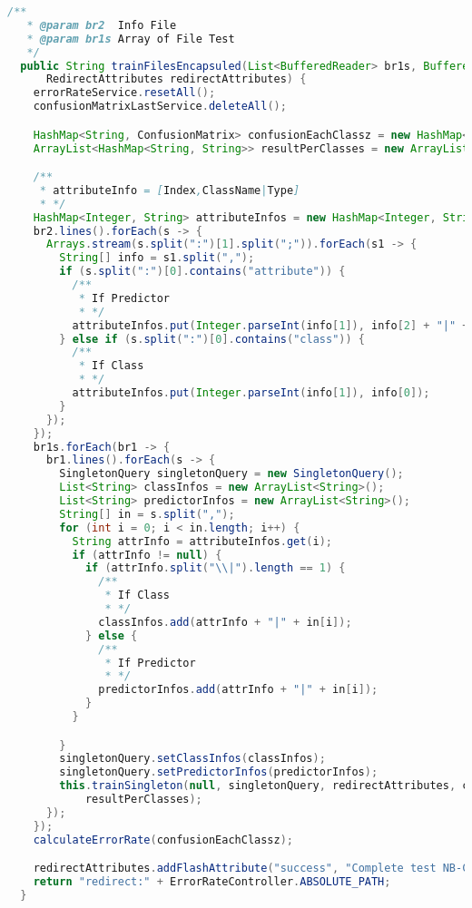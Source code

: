 \begin{lstlisting}[language=Java,basicstyle=\tiny,caption=TestingController.java]
  /**
   * @param br2  Info File
   * @param br1s Array of File Test
   */
  public String trainFilesEncapsuled(List<BufferedReader> br1s, BufferedReader br2,
      RedirectAttributes redirectAttributes) {
    errorRateService.resetAll();
    confusionMatrixLastService.deleteAll();

    HashMap<String, ConfusionMatrix> confusionEachClassz = new HashMap<String, ConfusionMatrix>();
    ArrayList<HashMap<String, String>> resultPerClasses = new ArrayList<HashMap<String, String>>();

    /**
     * attributeInfo = [Index,ClassName|Type]
     * */
    HashMap<Integer, String> attributeInfos = new HashMap<Integer, String>();
    br2.lines().forEach(s -> {
      Arrays.stream(s.split(":")[1].split(";")).forEach(s1 -> {
        String[] info = s1.split(",");
        if (s.split(":")[0].contains("attribute")) {
          /**
           * If Predictor
           * */
          attributeInfos.put(Integer.parseInt(info[1]), info[2] + "|" + info[0]);
        } else if (s.split(":")[0].contains("class")) {
          /**
           * If Class
           * */
          attributeInfos.put(Integer.parseInt(info[1]), info[0]);
        }
      });
    });
    br1s.forEach(br1 -> {
      br1.lines().forEach(s -> {
        SingletonQuery singletonQuery = new SingletonQuery();
        List<String> classInfos = new ArrayList<String>();
        List<String> predictorInfos = new ArrayList<String>();
        String[] in = s.split(",");
        for (int i = 0; i < in.length; i++) {
          String attrInfo = attributeInfos.get(i);
          if (attrInfo != null) {
            if (attrInfo.split("\\|").length == 1) {
              /**
               * If Class
               * */
              classInfos.add(attrInfo + "|" + in[i]);
            } else {
              /**
               * If Predictor
               * */
              predictorInfos.add(attrInfo + "|" + in[i]);
            }
          }

        }
        singletonQuery.setClassInfos(classInfos);
        singletonQuery.setPredictorInfos(predictorInfos);
        this.trainSingleton(null, singletonQuery, redirectAttributes, confusionEachClassz,
            resultPerClasses);
      });
    });
    calculateErrorRate(confusionEachClassz);

    redirectAttributes.addFlashAttribute("success", "Complete test NB-Classifier");
    return "redirect:" + ErrorRateController.ABSOLUTE_PATH;
  }


\end{lstlisting}
